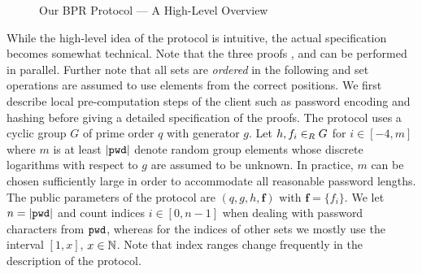 \begin{figure*}[htp]
{}
\caption{Our BPR Protocol --- A High-Level Overview}
\label{fig:protocol-overview}
\end{figure*}


While the high-level idea of the protocol is intuitive, the actual specification becomes somewhat technical.
Note that the three proofs \PoM, \PoE and \PoS can be performed in parallel.
Further note that all sets are \emph{ordered} in the following and set operations are assumed to use elements from the correct positions.
We first describe local pre-computation steps of the client such as password encoding and hashing before giving a detailed specification of the proofs.
The protocol uses a cyclic group $G$ of prime order $q$ with generator $g$.
Let $h,f_i\in_R G$ for $i\in[-4,m]$ where $m$ is at least $|\mathtt{pwd}|$ denote random group elements whose discrete logarithms with respect to $g$ are assumed to be unknown. 
In practice, $m$ can be chosen sufficiently large in order to accommodate all reasonable password lengths. The public parameters of the protocol are $(q,g,h,\bm f)$ with $\bm f = \{f_i\}$.
We let $n = |\mathtt{pwd}|$ and count indices $i\in[0,n-1]$ when dealing with password characters from $\mathtt{pwd}$, whereas for the indices of other sets we mostly use the interval $[1,x]$, $x\in\mathbb{N}$. Note that index ranges change frequently in the description of the protocol.




